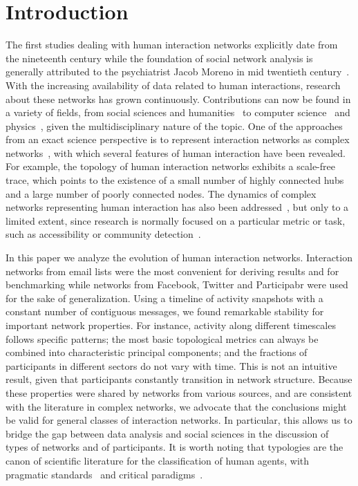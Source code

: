 \documentclass[%
	aip,
	jmp,%
	amsmath,amssymb,
	reprint,%
]{revtex4-1}
\begin{document}
\section{Introduction}\label{sec:into}
The first studies dealing with human interaction networks explicitly
date from the nineteenth century while the foundation of
social network analysis is generally attributed to the psychiatrist Jacob Moreno in mid twentieth century~\cite{moreno,newmanBook}. With the increasing availability of data related to human interactions, research about these networks has grown continuously. Contributions can now be found in a variety of fields, from social sciences and humanities~\cite{latour2013} to computer science~\cite{bird} and physics~\cite{barabasiHumanDyn,newmanFriendship}, given the multidisciplinary nature of the topic. One of the approaches from an exact science perspective is to represent interaction networks as complex networks~\cite{barabasiHumanDyn,newmanFriendship}, with which 
several features of human interaction have been revealed. For example, the topology of human interaction networks exhibits a scale-free trace, which points to the existence of a small number of highly connected hubs and a large number of poorly connected nodes. The dynamics of complex networks representing human interaction has also been addressed~\cite{barabasiEvo,newmanEvolving}, but only to a limited extent, since research is normally focused on a particular metric or task, such as accessibility or community detection~\cite{access,newmanModularity}. 

In this paper we analyze the evolution of human interaction networks.
Interaction networks from email lists were the most convenient for deriving results and for benchmarking while networks from Facebook, Twitter and Participabr were used for the sake of generalization.
Using a timeline of activity snapshots with a constant number of contiguous messages, we found remarkable stability for important network properties. For instance, activity along different timescales follows specific patterns; the most basic topological metrics can always be combined into characteristic principal components; and the fractions of participants in different sectors do not vary with time. This is not an intuitive result, given that participants constantly transition in network structure. Because these properties were shared by networks from various sources, and are consistent with the literature in complex networks, we advocate that the conclusions might be valid for general classes of interaction networks. In particular, this allows us to 
bridge the gap between data analysis and social sciences in the discussion of types of networks and of participants.
It is worth noting that typologies are the canon of scientific literature for the classification of human agents, with pragmatic standards~\cite{myers} and critical paradigms~\cite{adorno,typCanon}. 
\end{document}
